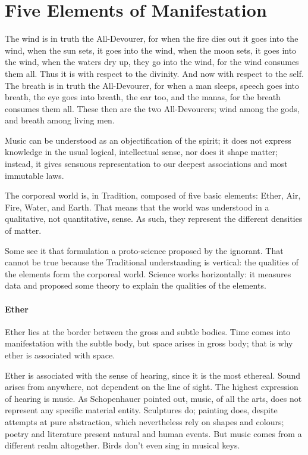 \section{Five Elements of Manifestation}

\begin{quotex}
The wind is in truth the All-Devourer, for when the fire dies out it goes into the wind, when the sun sets, it goes into the wind, when the moon sets, it goes into the wind, when the waters dry up, they go into the wind, for the wind consumes them all. Thus it is with respect to the divinity. And now with respect to the self. The breath is in truth the All-Devourer, for when a man sleeps, speech goes into breath, the eye goes into breath, the ear too, and the manas, for the breath consumes them all. These then are the two All-Devourers; wind among the gods, and breath among living men.

Music can be understood as an objectification of the spirit; it does not express knowledge in the usual logical, intellectual sense, nor does it shape matter; instead, it gives sensuous representation to our deepest associations and most immutable laws.
\end{quotex}

The corporeal world is, in Tradition, composed of five basic elements: Ether, Air, Fire, Water, and Earth. That means that the world was understood in a qualitative, not quantitative, sense. As such, they represent the different densities of matter.

Some see it that formulation a proto-science proposed by the ignorant. That cannot be true because the Traditional understanding is vertical: the qualities of the elements form the corporeal world. Science works horizontally: it measures data and proposed some theory to explain the qualities of the elements.

\paragraph{Ether}


Ether lies at the border between the gross and subtle bodies. Time comes into manifestation with the subtle body, but space arises in gross body; that is why ether is associated with space.

Ether is associated with the sense of hearing, since it is the most ethereal. Sound arises from anywhere, not dependent on the line of sight. The highest expression of hearing is music. As Schopenhauer pointed out, music, of all the arts, does not represent any specific material entity. Sculptures do; painting does, despite attempts at pure abstraction, which nevertheless rely on shapes and colours; poetry and literature present natural and human events. But music comes from a different realm altogether. Birds don't even sing in musical keys.

